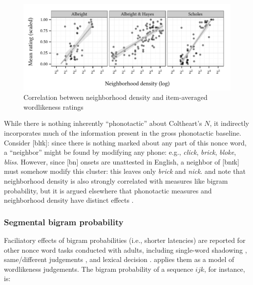 
\begin{figure}
\centering
\includegraphics{neighborhood.pdf}
\caption{Correlation between neighborhood density and item-averaged wordlikeness ratings}
\label{neighborhood}
\end{figure}

While there is nothing inherently ``phonotactic'' about Coltheart's $N$, it indirectly incorporates much of the information present in the gross phonotactic baseline. 
Consider [blɪk]: since there is nothing marked about any part of this nonce word, a ``neighbor'' might be found by modifying any phone: e.g., \emph{click}, \emph{brick}, \emph{bloke}, \emph{bliss}. 
However, since [bn] onsets are unattested in English, a neighbor of [bnɪk] must somehow modify this cluster: this leaves only \emph{brick} and \emph{nick}. 
\citet{Bailey2001} and \citet{Frauenfelder1993} note that neighborhood density is also strongly correlated with measures like bigram probability, but it is argued elsewhere that phonotactic measures and neighborhood density have distinct effects \citep[e.g.,][]{Berent2003,Pitt1998b,Vitevitch1998,Vitevitch1999a}. 

\subsubsection{Segmental bigram probability}

Faciliatory effects of bigram probabilities (i.e., shorter latencies) are reported for other nonce word tasks conducted with adults, including single-word shadowing \citep{Vitevitch1997,Vitevitch1998}, same/different judgements \citep{Lipinski2005,Luce2001,Vitevitch1999a,Vitevitch2005}, and lexical decision \citep{Pylkkanen2002a}. \citet{Albright2009a} applies them as a model of wordlikeness judgements. The bigram probability of a sequence $ijk$, for instance, is:

